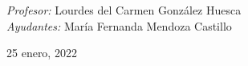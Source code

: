 \begin{center}
\begin{minipage}{0.46\textwidth}
        \begin{flushright} \large						\small										
            \emph{Profesor:} 
            Lourdes del Carmen González Huesca  \\
           \emph{Ayudantes:} 
           María Fernanda Mendoza Castillo \\
        \end{flushright}																	
    \end{minipage}	
    \vspace*{1cm}
    \vspace{2cm}
    \begin{center}						
        {\large 25 enero, 2022}
    \end{center}  						
\end{center}	
\textbf{}